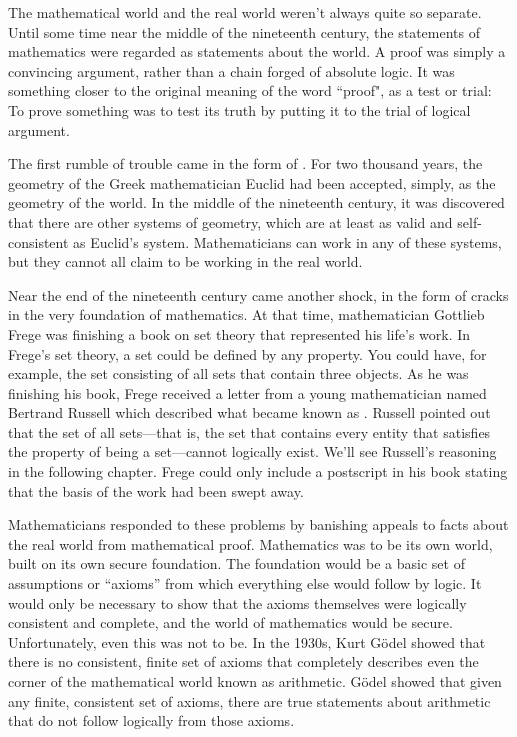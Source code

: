 The mathematical world and the real world weren't always quite so
separate.  Until some time near the middle of the nineteenth
century, the statements of mathematics were regarded as
statements about the world.  A proof was simply a convincing
argument, rather than a chain forged of absolute logic.  
It was something closer to the original meaning of the word ``proof",
as a test or trial:  To prove something was to test its truth by
putting it to the trial of logical argument.

The first rumble of trouble came in the form of .  For two thousand years, the geometry of the Greek mathematician
Euclid had been accepted, simply, as the geometry of the world.
In the middle of the nineteenth century, it was discovered that
there are other systems of geometry, which are at least as valid
and self-consistent as Euclid's system.  Mathematicians can work
in any of these systems, but they cannot all claim to be working 
in the real world.

Near the end of the nineteenth century came another shock, in the form
of cracks in the very foundation of mathematics.  At that time,
mathematician Gottlieb Frege was finishing
a book on set theory that represented his life's work.  In Frege's
set theory, a set could be defined by any property.  You could have,
for example, the set consisting of all sets that contain three objects.
As he was finishing his book, Frege received a letter from a young
mathematician named Bertrand Russell which
described what became known as .  Russell
pointed out that the set of all sets---that is, the set that contains
every entity that satisfies the property of being a set---cannot logically
exist.  We'll see Russell's reasoning in the following chapter.  Frege could
only include a postscript in his book stating that the basis of the
work had been swept away.

Mathematicians responded to these problems by banishing appeals to
facts about the real world from mathematical proof.  Mathematics was to
be its own world, built on its own secure foundation.  The foundation
would be a basic set of assumptions or ``axioms'' from which
everything else would follow by logic.  It would only be
necessary to show that the axioms themselves were logically consistent and complete,
and the world of mathematics would be secure.  Unfortunately,
even this was not to be.  In the 1930s, Kurt G\"odel
showed that there is no consistent, finite set of axioms that completely
describes even the corner of the mathematical world known as
arithmetic.  G\"odel showed that given any finite, consistent set of
axioms, there are true statements about arithmetic that do not follow
logically from those axioms.

